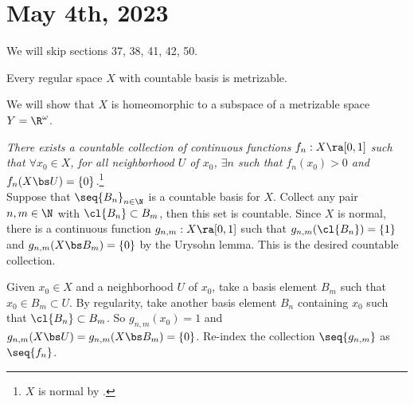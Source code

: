 \section*{May 4th, 2023}

We will skip sections 37, 38, 41, 42, 50.


  Every regular space \(X\) with countable basis is metrizable.

\pf We will show that \(X\) is homeomorphic to a subspace of a metrizable space \(Y = \R^\omega\).

 \textit{There exists a countable collection of continuous functions \(f_n : X \ra [0, 1]\) such that \(\forall x_0 \in X\), for all neighborhood \(U\) of \(x_0\), \(\exists n\) such that \(f_n(x_0) > 0\) and \(f_n (X \bs U) = \{0\}\).}\footnote{\(X\) is normal by .} \\
Suppose that \(\seq{B_n}_{n\in \N}\) is a countable basis for \(X\). Collect any pair \(n, m \in \N\) with \(\cl{B_n} \subset B_m\), then this set is countable. Since \(X\) is normal, there is a continuous function \(g_{n,m} : X \ra [0, 1]\) such that \(g_{n,m}(\cl{B_n}) = \{1\}\) and \(g_{n,m}(X \bs B_m) = \{0\}\) by the Urysohn lemma. This is the desired countable collection.

Given \(x_0 \in X\) and a neighborhood \(U\) of \(x_0\), take a basis element \(B_m\) such that \(x_0 \in B_m \subset U\). By regularity, take another basis element \(B_n\) containing \(x_0\) such that \(\cl{B_n} \subset B_m\). So \(g_{n,m}(x_0) = 1\) and \(g_{n,m}(X \bs U) = g_{n, m}(X \bs B_m) = \{0\}\). Re-index the collection \(\seq{g_{n, m}}\) as \(\seq{f_n}\).

